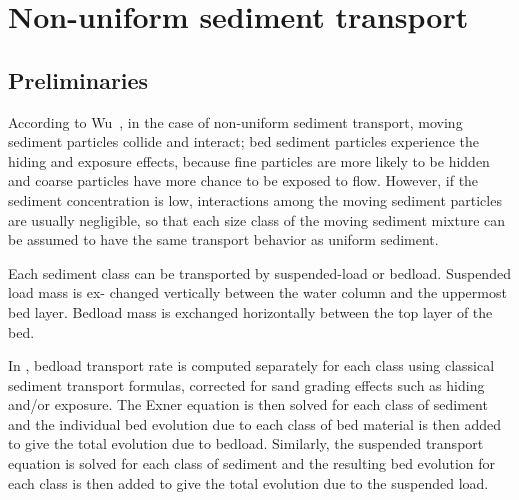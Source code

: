 \chapter[Non-uniform sediment transport]{Non-uniform sediment transport}

\section{Preliminaries}
According to Wu~\cite{wu2007computational}, in the case of non-uniform sediment transport, moving sediment particles collide and interact; bed sediment particles experience the hiding and exposure effects, because fine particles are more likely to be hidden and coarse particles have more chance to be
exposed to flow. However, if the sediment concentration is low, interactions among the
moving sediment particles are usually negligible, so that each size class of the moving
sediment mixture can be assumed to have the same transport behavior as uniform
sediment.

Each sediment class can be transported by suspended-load or bedload. Suspended load mass is ex-
changed vertically between the water column and the uppermost bed layer. Bedload mass is exchanged horizontally between the top layer of the bed.

In \sisyphe{}, bedload transport rate is computed separately for each class using
classical sediment transport formulas, corrected for sand grading effects such as hiding and/or exposure. The Exner equation is then solved for each class of sediment and the individual bed evolution due to each class of bed material is then added to give the total evolution due to bedload. Similarly, the suspended transport equation is solved for each class of sediment and the resulting bed evolution for each class is then added to give the total evolution due to the suspended load.

